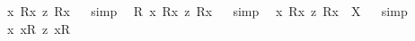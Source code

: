 \begin{isabellebody}
%
\endisatagproof
{\isafoldproof}%
%
\isadelimproof
%
\endisadelimproof
\isanewline
\isanewline
{}\isamarkupfalse%
\ {\isachardoublequoteopen}{\isacharbrackleft}{\isasymforall}{\isacharparenleft}{\isasymlambda}x{\isachardot}\ {\isacharless}R{}{\isasymbullet}{\isachardot}x{\isachardot}{\isachargreater}\ {\isasymrightarrow}\isactrlsup z\ {\isacharless}R{}{\isasymbullet}{\isachardot}x{\isachardot}{\isachargreater}{\isacharparenright}{\isacharbrackright}{\isachardoublequoteclose}%
\isadelimproof
\ %
\endisadelimproof
%
\isatagproof
{}\isamarkupfalse%
\ {\isacharparenleft}simp{\isacharparenright}\ \isamarkupfalse%
%
\endisatagproof
{\isafoldproof}%
%
\isadelimproof
%
\endisadelimproof
\isanewline
{}\isamarkupfalse%
\ {\isachardoublequoteopen}{\isacharbrackleft}{\isasymforall}{\isacharparenleft}{\isasymlambda}R{\isachardot}\ {\isasymforall}{\isacharparenleft}{\isasymlambda}x{\isachardot}\ {\isacharless}{\isachardot}R{\isachardot}{\isasymbullet}{\isachardot}x{\isachardot}{\isachargreater}\ {\isasymrightarrow}\isactrlsup z\ {\isacharless}{\isachardot}R{\isachardot}{\isasymbullet}{\isachardot}x{\isachardot}{\isachargreater}{\isacharparenright}{\isacharparenright}{\isacharbrackright}{\isachardoublequoteclose}%
\isadelimproof
\ %
\endisadelimproof
%
\isatagproof
{}\isamarkupfalse%
\ {\isacharparenleft}simp{\isacharparenright}\ \isamarkupfalse%
%
\endisatagproof
{\isafoldproof}%
%
\isadelimproof
%
\endisadelimproof
\isanewline
{}\isamarkupfalse%
\ {\isachardoublequoteopen}{\isasymforall}{\isacharparenleft}{\isasymlambda}x{\isachardot}\ {\isacharless}R{}{\isasymbullet}{\isachardot}x{\isachardot}{\isachargreater}\ {\isasymrightarrow}\isactrlsup z\ {\isacharless}R{}{\isasymbullet}{\isachardot}x{\isachardot}{\isachargreater}{\isacharparenright}\ {\isacharequal}\ X{\isachardoublequoteclose}%
\isadelimproof
\ %
\endisadelimproof
%
\isatagproof
{}\isamarkupfalse%
\ {\isacharparenleft}simp{\isacharparenright}\ \isamarkupfalse%
%
\endisatagproof
{\isafoldproof}%
%
\isadelimproof
%
\endisadelimproof
\isanewline
\isanewline
{}\isamarkupfalse%
\ {\isachardoublequoteopen}{\isacharbrackleft}{\isasymforall}{\isacharparenleft}{\isasymlambda}x{\isachardot}\ {\isacharless}{\isachardot}x{\isachardot}{\isasymcirc}R{}{\isachargreater}\ {\isasymrightarrow}\isactrlsup z\ {\isacharless}{\isachardot}x{\isachardot}{\isasymcirc}R{}{\isachargreater}{\isacharparenright}{\isacharbrackright}{\isachardoublequoteclose}%

\end{isabellebody}

